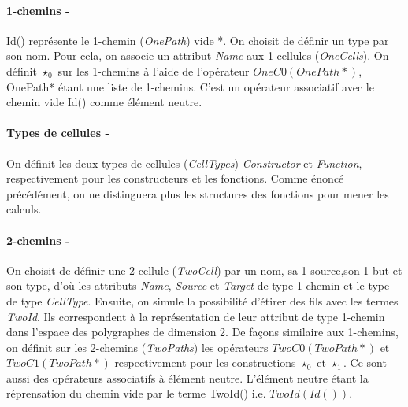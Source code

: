 \documentclass[a4paper,11pt,titlepage]{article}
\begin{document}
\paragraph{1-chemins -} Id() repr\'{e}sente le 1-chemin (\textit{OnePath}) vide *. On choisit de d\'{e}finir un type par son nom. Pour cela, on associe un attribut \textit{Name} aux 1-cellules (\textit{OneCells}). On d\'{e}finit $\star_{0}$ sur les 1-chemins \`{a} l'aide de l'op\'{e}rateur $OneC0(OnePath*)$, OnePath* \'{e}tant une liste de 1-chemins. C'est un op\'{e}rateur associatif avec le chemin vide Id() comme \'{e}l\'{e}ment neutre.
\paragraph{Types de cellules -} On d\'{e}finit les deux types de cellules (\textit{CellTypes}) \textit{Constructor} et \textit{Function}, respectivement pour les constructeurs et les fonctions. Comme \'{e}nonc\'{e} pr\'{e}c\'{e}d\'{e}ment, on ne distinguera plus les structures des fonctions pour mener les calculs.
\paragraph{2-chemins -}On choisit de d\'{e}finir une 2-cellule (\textit{TwoCell}) par un nom, sa 1-source,son 1-but et son type, d'o\`{u} les attributs \textit{Name}, \textit{Source} et \textit{Target} de type 1-chemin et le type de type \textit{CellType}. Ensuite, on simule la possibilit\'{e} d'\'{e}tirer des fils avec les termes \textit{TwoId}. Ils correspondent \`{a} la repr\'{e}sentation de leur attribut de type 1-chemin dans l'espace des polygraphes de dimension 2. De fa\c{c}ons similaire aux 1-chemins, on d\'{e}finit sur les 2-chemins (\textit {TwoPaths}) les op\'{e}rateurs $TwoC0(TwoPath*)$ et $TwoC1(TwoPath*)$ respectivement pour les constructions $\star_{0}$ et $\star_{1}$. Ce sont aussi des op\'{e}rateurs associatifs \`{a} \'{e}l\'{e}ment neutre. L'\'{e}l\'{e}ment neutre \'{e}tant la r\'{e}prensation du chemin vide par le terme TwoId() i.e. $TwoId(Id())$.
\end{document}
